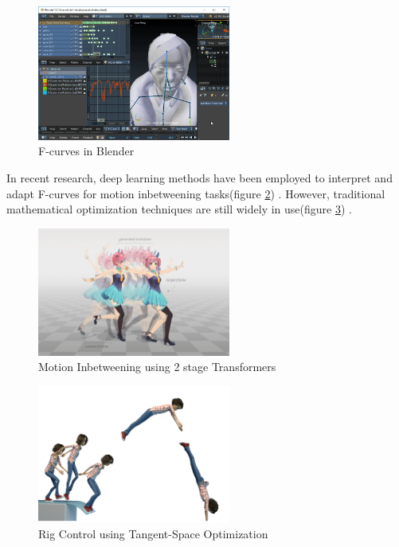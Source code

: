 \documentclass[../../main.tex]{subfiles}
\begin{document}
\begin{figure}
    \centering \includegraphics[width = 2.5in]{chapters/intermediate_blocks/images/fcurves_blender.png}
    \caption{F-curves in Blender}
    \label{fig:fcurves_blender}
\end{figure}

In recent research, deep learning methods have been employed to interpret and adapt F-curves for motion inbetweening tasks(figure \ref{fig:inbetweening_transformers}) \cite{10.1145/3550454.3555454}. However, traditional mathematical optimization techniques are still widely in use(figure \ref{fig:inbetweening_disney}) \cite{10.1145/3306346.3322938}.

\begin{figure}
    \centering \includegraphics[width = 2.5in]{chapters/intermediate_blocks/images/inbetweening_transformers.jpg}
    \caption{Motion Inbetweening using 2 stage Transformers \cite{10.1145/3306346.3322938}}
    \label{fig:inbetweening_transformers}
\end{figure}

\begin{figure}
    \centering \includegraphics[width = 2.5in]{chapters/intermediate_blocks/images/inbetweening_disney.png}
    \caption{Rig Control using Tangent-Space Optimization}
    \label{fig:inbetweening_disney}
\end{figure}
\end{document}
